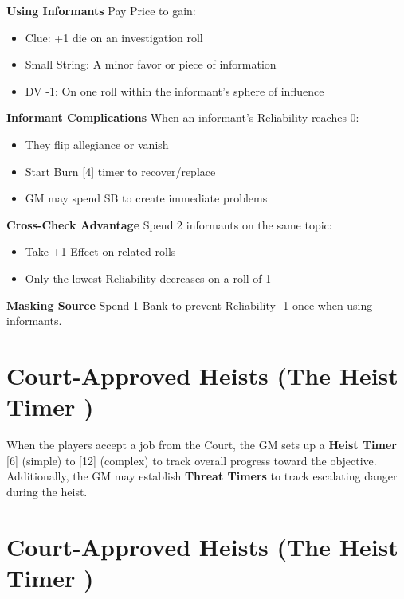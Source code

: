 \documentclass[10pt,twoside]{book}
\begin{document}
\noindent\textbf{Using Informants}
Pay Price to gain:
\begin{itemize}
\item Clue: +1 die on an investigation roll
\item Small String: A minor favor or piece of information
\item DV -1: On one roll within the informant's sphere of influence
\end{itemize}

\noindent\textbf{Informant Complications}
When an informant's Reliability reaches 0:
\begin{itemize}
\item They flip allegiance or vanish
\item Start Burn [4] timer to recover/replace
\item GM may spend SB to create immediate problems
\end{itemize}

\noindent\textbf{Cross-Check Advantage}
Spend 2 informants on the same topic:
\begin{itemize}
\item Take +1 Effect on related rolls
\item Only the lowest Reliability decreases on a roll of 1
\end{itemize}

\noindent\textbf{Masking Source}
Spend 1 Bank to prevent Reliability -1 once when using informants.

\chapter{Court-Approved Heists (The Heist Timer )}

When the players accept a job from the Court, the GM sets up a \textbf{Heist Timer } [6] (simple) to [12] (complex) to track overall progress toward the objective. Additionally, the GM may establish \textbf{Threat Timers} to track escalating danger during the heist.

\chapter{Court-Approved Heists (The Heist Timer )}
\end{document}
